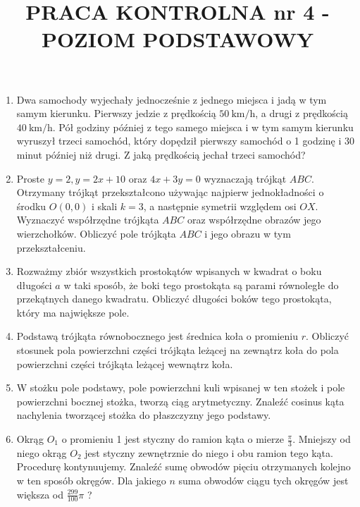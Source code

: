 \documentclass[10pt]{article}
\title{PRACA KONTROLNA nr 4 - POZIOM PODSTAWOWY }
\author{}
\date{}
\begin{document}
\maketitle
\begin{enumerate}
  \item Dwa samochody wyjechały jednocześnie z jednego miejsca i jadą w tym samym kierunku. Pierwszy jedzie z prędkością $50 \mathrm{~km} / \mathrm{h}$, a drugi z prędkością $40 \mathrm{~km} / \mathrm{h}$. Pół godziny później z tego samego miejsca i w tym samym kierunku wyruszył trzeci samochód, który dopędził pierwszy samochód o 1 godzinę i 30 minut później niż drugi. Z jaką prędkością jechał trzeci samochód?
  \item Proste $y=2, y=2 x+10$ oraz $4 x+3 y=0$ wyznaczają trójkąt $A B C$. Otrzymany trójkąt przekształcono używając najpierw jednokładności o środku $O(0,0)$ i skali $k=3$, a następnie symetrii względem osi $O X$. Wyznaczyć współrzędne trójkąta $A B C$ oraz współrzędne obrazów jego wierzchołków. Obliczyć pole trójkąta $A B C$ i jego obrazu w tym przekształceniu.
  \item Rozważmy zbiór wszystkich prostokątów wpisanych w kwadrat o boku długości $a$ w taki sposób, że boki tego prostokąta są parami równoległe do przekątnych danego kwadratu. Obliczyć długości boków tego prostokąta, który ma największe pole.
  \item Podstawą trójkąta równobocznego jest średnica koła o promieniu $r$. Obliczyć stosunek pola powierzchni części trójkąta leżącej na zewnątrz koła do pola powierzchni części trójkąta leżącej wewnątrz koła.
  \item W stożku pole podstawy, pole powierzchni kuli wpisanej w ten stożek i pole powierzchni bocznej stożka, tworzą ciąg arytmetyczny. Znaleźć cosinus kąta nachylenia tworzącej stożka do płaszczyzny jego podstawy.
  \item Okrąg $O_{1}$ o promieniu 1 jest styczny do ramion kąta o mierze $\frac{\pi}{3}$. Mniejszy od niego okrąg $O_{2}$ jest styczny zewnętrznie do niego i obu ramion tego kąta. Procedurę kontynuujemy. Znaleźć sumę obwodów pięciu otrzymanych kolejno w ten sposób okręgów. Dla jakiego $n$ suma obwodów ciągu tych okręgów jest większa od $\frac{299}{100} \pi$ ?
\end{enumerate}
\end{document}
